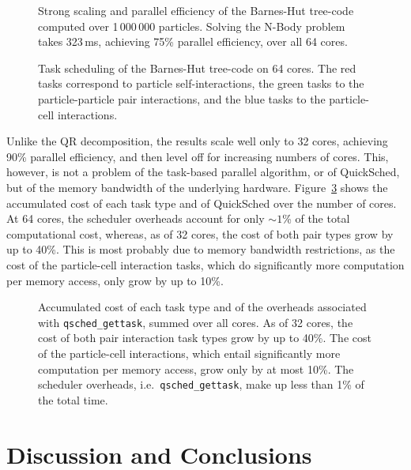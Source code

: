 \documentclass[preprint]{elsarticle}
\newcommand{\fig}[1]
    {Figure~\ref{fig:#1}}
\begin{document}
\begin{figure}
    \centerline{}
    \caption{Strong scaling and parallel efficiency of the Barnes-Hut tree-code
        computed over 1\,000\,000 particles.
        Solving the N-Body problem takes 323\,ms, achieving 75\% parallel
        efficiency, over all 64 cores.
        }
    \label{fig:BHResults}
\end{figure}

\begin{figure}
    \centerline{}
    \caption{Task scheduling of the Barnes-Hut tree-code on 64 cores.
      The red tasks correspond to particle self-interactions, the green
      tasks to the particle-particle pair interactions, and the blue
      tasks to the particle-cell interactions.}
    \label{fig:BHTasksPlot}
\end{figure}

Unlike the QR decomposition, the results scale well only to
32 cores, achieving 90\% parallel efficiency, and then
level off for increasing numbers of cores.
This, however, is not a problem of the task-based parallel
algorithm, or of QuickSched, but of the memory bandwidth
of the underlying hardware.
\fig{BHTimes} shows the accumulated cost of each task type and of 
QuickSched over the number of cores.
At 64 cores, the scheduler overheads account for only $\sim 1$\% of
the total computational cost, whereas,
as of 32 cores, the cost of both pair types grow by up to
40\%.
This is most probably due to memory bandwidth restrictions, as
the cost of the particle-cell interaction tasks, which do significantly more
computation per memory access, only grow by up to 10\%.

\begin{figure}
    \centerline{}
    \caption{Accumulated cost of each task type and of the overheads
        associated with {\tt qsched\_gettask}, summed over all cores.
        As of 32 cores, the cost of both pair interaction task
        types grow by up to 40\%.
        The cost of the particle-cell interactions, which entail significantly more
        computation per memory access, grow only by at most 10\%.
        The scheduler overheads, i.e.~{\tt qsched\_gettask},
        make up less than 1\% of the total time.}
    \label{fig:BHTimes}
\end{figure}


\section{Discussion and Conclusions}
\end{document}

